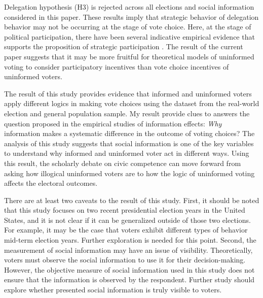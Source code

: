\documentclass[doc,natbib,12pt]{apa6}\usepackage[]{graphicx}\usepackage[]{color}
\begin{document}
    \par Delegation hypothesis (H3) is rejected across all elections and social information considered in this paper. These results imply that strategic behavior of delegation behavior may not be occurring at the stage of vote choice. Here, at the stage of political participation, there have been several indicative empirical evidence that supports the proposition of strategic participation \cite{McMurray2010emev,Cantoni2017pras}. The result of the current paper suggests that it may be more fruitful for theoretical models of uninformed voting to consider participatory incentives than vote choice incentives of uninformed voters. 
    
    \par The result of this study provides evidence that informed and uninformed voters apply different logics in making vote choices using the dataset from the real-world election and general population sample. My result provide clues to answers the question proposed in the empirical studies of information effects: \textit{Why} information makes a systematic difference in the outcome of voting choices? The analysis of this study suggests that social information is one of the key variables to understand why informed and uninformed voter act in different ways. Using this result, the scholarly debate on civic competence can move forward from asking how illogical uninformed voters are to how the logic of uninformed voting affects the electoral outcomes. 
    
    \par There are at least two caveats to the result of this study. First, it should be noted that this study focuses on two recent presidential election years in the United States, and it is not clear if it can be generalized outside of those two elections. For example, it may be the case that voters exhibit different types of behavior mid-term election years. Further exploration is needed for this point. Second, the measurement of social information may have an issue of visibility. Theoretically, voters must observe the social information to use it for their decision-making. However, the objective measure of social information used in this study does not ensure that the information is observed by the respondent. Further study should explore whether presented social information is truly visible to voters. 
    
\end{document}
